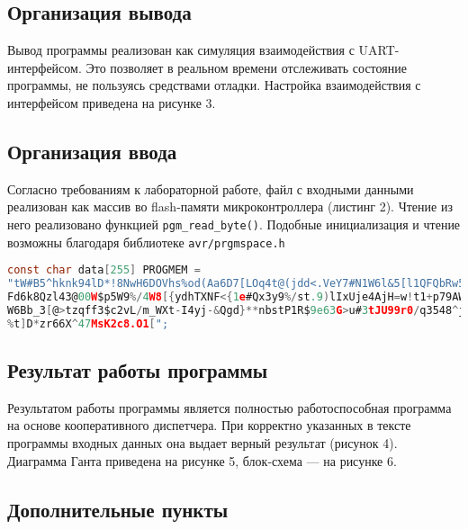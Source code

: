 \subsection{Организация вывода}

Вывод программы реализован как симуляция взаимодействия с \linebreak UART-интерфейсом. Это позволяет в реальном времени отслеживать состояние программы, не пользуясь средствами отладки. Настройка взаимодействия с интерфейсом приведена на рисунке 3.


\subsection{Организация ввода}

Согласно требованиям к лабораторной работе, файл с входными данными реализован как массив во flash-памяти микроконтроллера (листинг 2). Чтение из него реализовано функцией \texttt{pgm\_read\_byte()}. Подобные инициализация и чтение возможны благодаря библиотеке \texttt{avr/prgmspace.h}

\begin{lstlisting}[language=c, caption={Массив входных данных}, numbers=none, lineskip={0pt}]
const char data[255] PROGMEM = 
"tW#B5^hknk94lD*!8NwH6DOVhs%od(Aa6D7[LOq4t@(jdd<.VeY7#N1W6l&5[l1QFQbRw5#Nv1@
Fd6k8Qzl43@00W$p5W9%/4W8[{ydhTXNF<{1e#Qx3y9%/st.9)lIxUje4AjH=w!t1+p79AWSk3}{
W6Bb_3[@>tzqff3$c2vL/m_WXt-I4yj-&Qgd}**nbstP1R$9e63G>u#3tJU99r0/q3548^jjR3u1
%t]D*zr66X^47MsK2c8.O1[";
\end{lstlisting}


\subsection{Результат работы программы}

Результатом работы программы является полностью работоспособная программа на основе кооперативного диспетчера. При корректно указанных в тексте программы входных данных она выдает верный результат (рисунок 4). Диаграмма Ганта приведена на рисунке 5, блок-схема — на рисунке 6.





\subsection{Дополнительные пункты}

